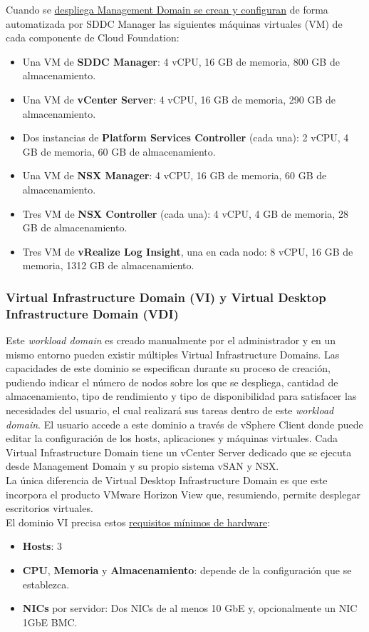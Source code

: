 Cuando se \underline{despliega Management Domain se crean y configuran} de forma automatizada por SDDC Manager las siguientes máquinas virtuales (VM) de cada componente de Cloud Foundation:
\begin{itemize}
    \item Una VM de \textbf{SDDC Manager}: 4 vCPU, 16 GB de memoria, 800 GB de almacenamiento.
    \item Una VM de \textbf{vCenter Server}: 4 vCPU, 16 GB de memoria, 290 GB de almacenamiento.
    \item Dos instancias de \textbf{Platform Services Controller} (cada una): 2 vCPU, 4 GB de memoria, 60 GB de almacenamiento.
    \item Una VM de \textbf{NSX Manager}: 4 vCPU, 16 GB de memoria, 60 GB de almacenamiento.
    \item Tres VM de \textbf{NSX Controller} (cada una): 4 vCPU, 4 GB de memoria, 28 GB de almacenamiento.
    \item Tres VM de \textbf{vRealize Log Insight}, una en cada nodo: 8 vCPU, 16 GB de memoria, 1312 GB de almacenamiento.
\end{itemize}


\subsubsection{Virtual Infrastructure Domain (VI) y Virtual Desktop Infrastructure Domain (VDI)}
\label{subsubsec:domainVI}
Este \textit{workload domain} es creado manualmente por el administrador y en un mismo entorno pueden existir múltiples Virtual Infrastructure Domains. Las capacidades de este dominio se especifican durante su proceso de creación, pudiendo indicar el número de nodos sobre los que se despliega, cantidad de almacenamiento, tipo de rendimiento y tipo de disponibilidad para satisfacer las necesidades del usuario, el cual realizará sus tareas dentro de este \textit{workload domain}. El usuario accede a este dominio a través de vSphere Client donde puede editar la configuración de los hosts, aplicaciones y máquinas virtuales.
Cada Virtual Infrastructure Domain tiene un vCenter Server dedicado que se ejecuta desde Management Domain y su propio sistema vSAN y NSX.\\
La única diferencia de Virtual Desktop Infrastructure Domain es que este incorpora el producto VMware Horizon View que, resumiendo, permite desplegar escritorios virtuales.\\
El dominio VI precisa estos \underline{requisitos mínimos de hardware}:
\begin{itemize}
    \item \textbf{Hosts}: 3
    \item \textbf{CPU}, \textbf{Memoria} y \textbf{Almacenamiento}: depende de la configuración que se establezca.
    \item \textbf{NICs} por servidor: Dos NICs de al menos 10 GbE y, opcionalmente un NIC 1GbE BMC.
\end{itemize}

